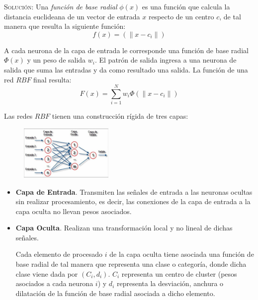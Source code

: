 \documentclass[letterpaper,11pt]{article}
\begin{document}
\begin{enumerate}
    \textsc{Solución:} Una \textit{función de base radial} $\phi(x)$ es una 
    función que calcula la distancia euclideana de un vector de entrada $x$
    respecto de un centro $c$, de tal manera que resulta la siguiente función:
    \begin{equation*}
        f(x) = (\| x - c_i\|)
    \end{equation*}

    A cada neurona de la capa de entrada le corresponde una función de base 
    radial $\Phi (x)$ y un peso de salida $w_i$. El patrón de salida ingresa a
    una neurona de salida que suma las entradas y da como resultado una salida.
    La función de una red $RBF$ final resulta:
    \begin{equation*}
        F(x) = \sum^N_{i=1} w_{i} \Phi (\| x - c_{i} \|)
    \end{equation*} 

    Las redes $RBF$ tienen una construcción rígida de tres capas:
    \begin{figure}[ht]
        \centering
        \includegraphics[width=0.4\textwidth]{./imagenes/rbf.png}
    \end{figure}  

    \begin{itemize}
        \item \textbf{Capa de Entrada}. Transmiten las señales de entrada a las 
        neuronas ocultas sin realizar procesamiento, es decir, las conexiones de 
        la capa de entrada a la capa oculta no llevan pesos asociados. 

        \item \textbf{Capa Oculta}. Realizan una transformación local y no lineal 
        de dichas señales.

        Cada elemento de procesado $i$ de la capa oculta tiene asociada una 
        función de base radial de tal manera que representa una clase o 
        categoría, donde dicha clase viene dada por $(C_i, d_i)$. $C_i$
        representa un centro de cluster (pesos asociados a cada neurona $i$) y 
        $d_i$ representa la desviación, anchura o dilatación de la función de 
        base radial asociada a dicho elemento. 


\end{itemize}
\end{enumerate}
\end{document}
